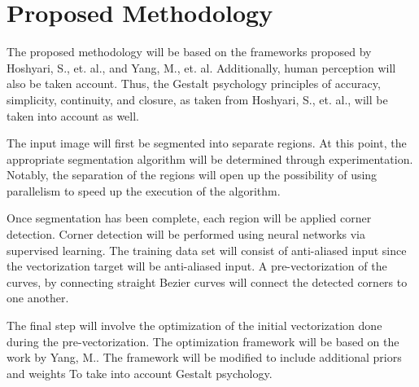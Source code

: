 \chapter{Proposed Methodology}

The proposed methodology will be based on the frameworks proposed by Hoshyari, S., et. al., and Yang, M., et. al. Additionally, human perception will also be taken account. Thus, the Gestalt psychology principles of accuracy, simplicity, continuity, and closure, as taken from Hoshyari, S., et. al., will be taken into account as well.

The input image will first be segmented into separate regions. At this point, the appropriate segmentation algorithm will be determined through experimentation. Notably, the separation of the regions will open up the possibility of using parallelism to speed up the execution of the algorithm.

Once segmentation has been complete, each region will be applied corner detection. Corner detection will be performed using neural networks via supervised learning. The training data set will consist of anti-aliased input since the vectorization target will be anti-aliased input. A pre-vectorization of the curves, by connecting straight Bezier curves will connect the detected corners to one another.

The final step will involve the optimization of the initial vectorization done during the pre-vectorization. The optimization framework will be based on the work by Yang, M.. The framework will be modified to include additional priors and weights To take into account Gestalt psychology.